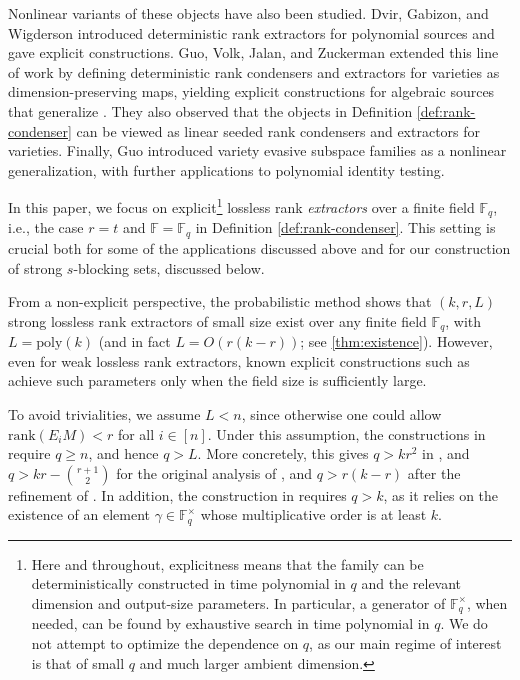 \documentclass[11pt]{article}
\newcommand{\rank}{\mathrm{rank}}
\newcommand{\F}{\mathbb{F}}
\newcommand{\poly}{\mathrm{poly}}
\begin{document}
Nonlinear variants of these objects have also been studied. Dvir, Gabizon, and Wigderson \cite{DGW09} introduced deterministic rank extractors for polynomial sources and gave explicit constructions. Guo, Volk, Jalan, and Zuckerman \cite{GVJZ23} extended this line of work by defining deterministic rank condensers and extractors for varieties as dimension-preserving maps, yielding explicit constructions for algebraic sources that generalize \cite{DGW09,Dvi12}. They also observed that the objects in Definition \ref{def:rank-condenser} can be viewed as linear seeded rank condensers and extractors for varieties. Finally, Guo \cite{Guo24} introduced variety evasive subspace families as a nonlinear generalization, with further applications to polynomial identity testing.



In this paper, we focus on explicit\footnote{Here and throughout, explicitness means that the family can be deterministically constructed in time polynomial in $q$ and the relevant dimension and output-size parameters. In particular, a generator of $\F_q^\times$, when needed, can be found by exhaustive search in time polynomial in $q$. We do not attempt to optimize the dependence on $q$, as our main regime of interest is that of small $q$ and much larger ambient dimension.} lossless rank \emph{extractors} over a finite field $\F_q$, i.e., the case $r=t$ and $\F=\F_q$ in Definition \ref{def:rank-condenser}. This setting is crucial both for some of the applications discussed above and for our construction of strong $s$-blocking sets, discussed below.

From a non-explicit perspective, the probabilistic method shows that $(k,r,L)$ strong lossless rank extractors of small size exist over any finite field $\F_q$, with $L=\poly(k)$ (and in fact $L=O(r(k-r))$; see \cref{thm:existence}). However, even for weak lossless rank extractors, known explicit constructions such as \cite{GR08,FS12} achieve such parameters only when the field size is sufficiently large. 

To avoid trivialities, we assume $L<n$, since otherwise one could allow $\rank(E_i M)<r$ for all $i\in[n]$. Under this assumption, the constructions in \cite{GR08,FS12} require $q \ge n$, and hence $q > L$. More concretely, this gives $q > kr^2$ in \cite{GR08}, and $q>kr-\binom{r+1}{2}$ for the original analysis of \cite{FS12}, and $q>r(k-r)$ after the refinement of \cite{FSS14}. In addition, the construction in \cite{FS12} requires $q>k$, as it relies on the existence of an element $\gamma\in\F_q^\times$ whose multiplicative order is at least $k$.
\end{document}
